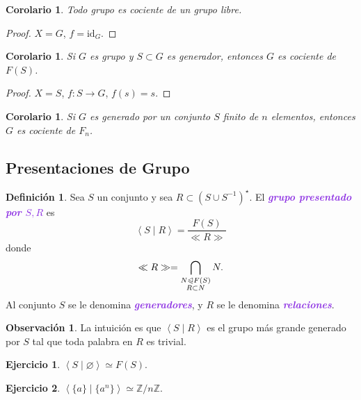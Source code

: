 \documentclass{article}
\newtheorem{corollary}[theorem]{Corolario}
\theoremstyle{definition}
\newtheorem{definition}[theorem]{Definición}
\newtheorem{exercise}{Ejercicio}
\newtheorem*{obs}{Observación}
\theoremstyle{remark}
\numberwithin{equation}{section}
\newcommand{\Z}{\mathbb{Z}}
\newcommand{\normal}{\trianglelefteqslant}
\newcommand{\id}{\mathrm{id}}
\newcommand{\gen}[1]{\left\langle #1 \right\rangle}
\newcommand{\zmz}[1]{\Z/ #1 \Z}
\newcommand{\wea}[1]{\textcolor{BlueViolet}{\textbf{\emph{#1}}}}
\begin{document}
\begin{corollary}
  Todo grupo es cociente de un grupo libre.
\end{corollary}
\begin{proof}
  $X = G$, $f = \id_G$.
\end{proof}

\begin{corollary}
  Si $G$ es grupo y $S \subset G$ es generador, entonces $G$ es cociente de $F(S)$.
\end{corollary}
\begin{proof}
  $X = S$, $f \colon S \to G$, $f(s) = s$.
\end{proof}

\begin{corollary}
  Si $G$ es generado por un conjunto $S$ finito de $n$ elementos, entonces $G$ es cociente de $F_n$.
\end{corollary}

\newpage
\subsection{Presentaciones de Grupo}

\begin{definition}
  Sea $S$ un conjunto y sea $R \subset (S \cup S^{-1})^\star$. El \wea{grupo presentado por $S,R$} es
  \[\gen{S \mid R} = \frac{F(S)}{\ll R \gg}\]
  donde
  \[\ll R \gg = \bigcap_{\substack{N \normal F(S) \\ R \subset N}} N.\]
  Al conjunto $S$ se le denomina \wea{generadores}, y $R$ se le denomina \wea{relaciones}.
\end{definition}

\begin{obs}
  La intuición es que $\gen{S \mid R}$ es el grupo más grande generado por $S$ tal que toda palabra en $R$ es trivial.
\end{obs}

\begin{exercise}
  $\gen{S \mid \varnothing} \simeq F(S)$.
\end{exercise}

\begin{exercise}
  $\gen{\{a\} \mid \{a^n\}} \simeq \zmz n$.
\end{exercise}
\end{document}
